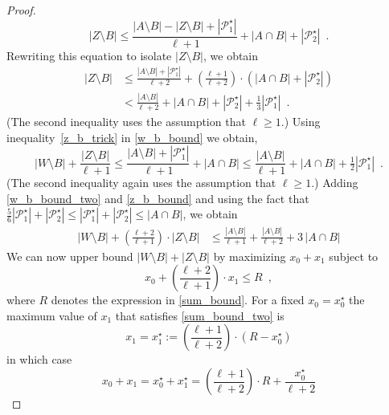 \documentclass{patmorin}
\begin{document}
\begin{proof}
  \[
     |Z\setminus B| \le \frac{|A\setminus B|-|Z\setminus B|+|\mathcal{P}_1^\star|}{\ell+1}+|A\cap B|+|\mathcal{P}_2^\star| \enspace .
  \]
  Rewriting this equation to isolate $|Z\setminus B|$, we obtain
  \begin{align}
     |Z\setminus B|
      & \le \frac{|A\setminus B|+|\mathcal{P}_1^\star|}{\ell+2} + \left(\frac{\ell+1}{\ell+2}\right)\cdot
        \left(|A\cap B|+|\mathcal{P}_2^\star|\right) \\
      & < \frac{|A\setminus B|}{\ell+2} +
        |A\cap B|+|\mathcal{P}_2^\star|+\tfrac{1}{3} |\mathcal{P}_1^\star|
        \enspace . \label{z_b_bound}
  \end{align}
  (The second inequality uses the assumption that $\ell\ge 1$.) Using inequality~\eqref{z_b_trick}  in \cref{w_b_bound} we obtain,
  \begin{equation}
      |W\setminus B|+\frac{|Z\setminus B|}{\ell+1}\le \frac{|A\setminus B|+|\mathcal{P}_1^\star|}{\ell+1} + |A\cap B|
      \le \frac{|A\setminus B|}{\ell+1} + |A\cap B| +\tfrac{1}{2}|\mathcal{P}_1^\star| \enspace .  \label{w_b_bound_two}
  \end{equation}
  (The second inequality again uses the assumption that $\ell\ge 1$.) Adding \eqref{w_b_bound_two} and \eqref{z_b_bound} and using the fact that $\tfrac{5}{6}|\mathcal{P}_1^\star|+|\mathcal{P}_2^\star|\le|\mathcal{P}_1^\star|+|\mathcal{P}_2^\star|\le |A\cap B|$, we obtain
  \begin{align}
    |W\setminus B| + \left(\frac{\ell+2}{\ell+1}\right)\cdot|Z\setminus B|
    & \le \frac{|A\setminus B|}{\ell+1} +
    \frac{|A\setminus B|}{\ell+2} + 3\,|A\cap B| \label{sum_bound}
  \end{align}
  We can now upper bound $|W\setminus B|+|Z\setminus B|$ by maximizing $x_0+x_1$ subject to
  \begin{equation}
     x_0+\left(\frac{\ell+2}{\ell+1}\right)\cdot x_1 \le R \enspace , \label{sum_bound_two}
  \end{equation}
  where $R$ denotes the expression in \eqref{sum_bound}.
  For a fixed $x_0=x^\star_0$ the maximum value of $x_1$ that satisfies \eqref{sum_bound_two} is
  \[
    x_1 = x_1^\star:=\left(\frac{\ell+1}{\ell+2}\right)\cdot(R-x^{\star}_0)
  \]
  in which case
  \[
     x_0 + x_1 = x^\star_0+x^\star_1 = \left(\frac{\ell+1}{\ell+2}\right)\cdot R + \frac{x^\star_0}{\ell+2}
\]
\end{proof}
\end{document}
